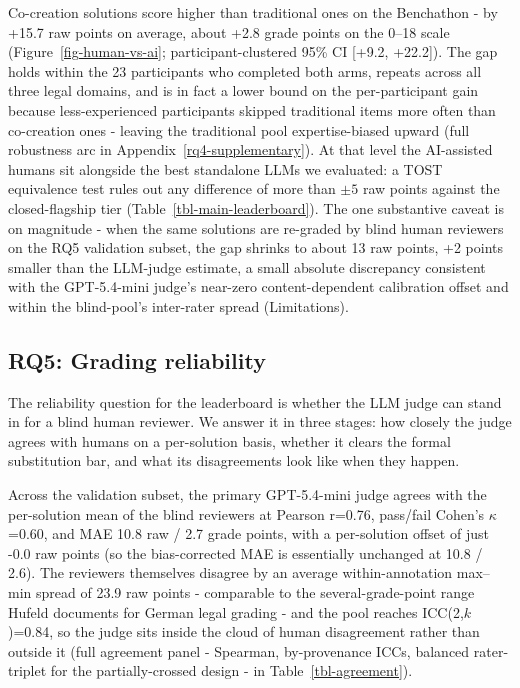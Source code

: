 \documentclass[11pt]{article}
\begin{document}
Co-creation solutions score higher than traditional ones on the
Benchathon - by +15.7 raw points on average, about +2.8 grade points on
the 0--18 scale (Figure~\ref{fig-human-vs-ai}; participant-clustered
95\% CI {[}+9.2, +22.2{]}). The gap holds within the 23 participants who
completed both arms, repeats across all three legal domains, and is in
fact a lower bound on the per-participant gain because less-experienced
participants skipped traditional items more often than co-creation ones
- leaving the traditional pool expertise-biased upward (full robustness
arc in Appendix~\ref{rq4-supplementary}). At that level the AI-assisted
humans sit alongside the best standalone LLMs we evaluated: a TOST
equivalence test rules out any difference of more than \(\pm 5\) raw
points against the closed-flagship tier
(Table~\ref{tbl-main-leaderboard}). The one substantive caveat is on
magnitude - when the same solutions are re-graded by blind human
reviewers on the RQ5 validation subset, the gap shrinks to about 13 raw
points, +2 points smaller than the LLM-judge estimate, a small absolute
discrepancy consistent with the GPT-5.4-mini judge's near-zero
content-dependent calibration offset and within the blind-pool's
inter-rater spread (Limitations).

\subsection{RQ5: Grading reliability}\label{rq5-grading-reliability}

The reliability question for the leaderboard is whether the LLM judge
can stand in for a blind human reviewer. We answer it in three stages:
how closely the judge agrees with humans on a per-solution basis,
whether it clears the formal substitution bar, and what its
disagreements look like when they happen.

Across the validation subset, the primary GPT-5.4-mini judge agrees with
the per-solution mean of the blind reviewers at Pearson r=0.76,
pass/fail Cohen's \(\kappa\)=0.60, and MAE 10.8 raw / 2.7 grade points,
with a per-solution offset of just -0.0 raw points (so the
bias-corrected MAE is essentially unchanged at 10.8 / 2.6). The
reviewers themselves disagree by an average within-annotation max--min
spread of 23.9 raw points - comparable to the several-grade-point range
Hufeld \citep{hufeld2024} documents for German legal grading - and the
pool reaches ICC(2,\(k\))=0.84, so the judge sits inside the cloud of
human disagreement rather than outside it (full agreement panel -
Spearman, by-provenance ICCs, balanced rater-triplet for the
partially-crossed design - in Table~\ref{tbl-agreement}).
\end{document}
